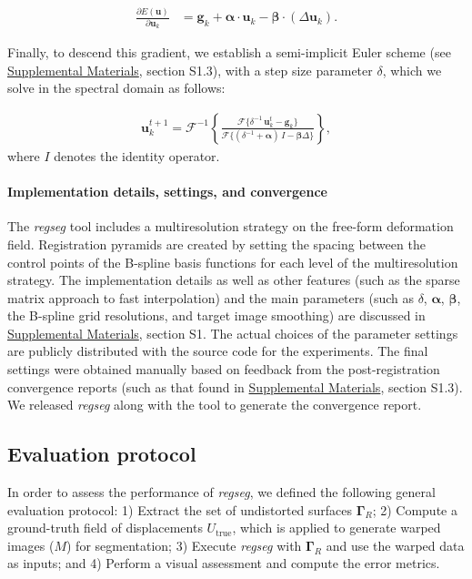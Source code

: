 \documentclass[3p,authoryear,fleqn]{elsarticle}
\providecommand{\gammaset}{\ensuremath{\boldsymbol{\Gamma}}}
\providecommand{\regseg}{\emph{regseg}}
\renewcommand{\vec}[1]{\mathbf{#1}}
\providecommand{\suppl}[1]{\href{http://figshare.com/s/459c26b4ee8211e493b306ec4bbcf141}{Supplemental Materials}, #1}
\begin{document}
  \begin{align}
  \frac{\partial E(\vec{u})}{\partial \vec{u}_k} &=
  \vec{g}_k  + \boldsymbol{\alpha} \cdot \vec{u}_k - \boldsymbol{\beta} \cdot (\Delta \vec{u}_k).
  \label{eq:final_gradient}
  \end{align}

Finally, to descend this gradient, we establish a semi-implicit Euler scheme (see \suppl{section S1.3}),
  with a step size parameter $\delta$, which we solve in the spectral domain as follows:

  \begin{align}
  \vec{u}_k^{t+1} = \mathcal{F}^{-1}\left\{ \frac{\mathcal{F}\{\delta^{-1} \, \vec{u}_k^t - \vec{g}_k\} }                  {\mathcal{F}\{(\delta^{-1} + \boldsymbol{\alpha})\, I - \boldsymbol{\beta}\Delta\}} \right\},
  \label{eq:update_equation}
  \end{align}
  where $I$ denotes the identity operator.


\paragraph*{Implementation details, settings, and convergence}
\label{sec:conv_report}
The \regseg{} tool includes a multiresolution strategy on the free-form deformation field.
Registration pyramids are created by setting the spacing between the control points of the B-spline basis
  functions for each level of the multiresolution strategy.
The implementation details as well as other features (such as the sparse matrix approach
  to fast interpolation) and the main parameters
  (such as $\delta$, $\boldsymbol{\alpha}$, $\boldsymbol{\beta}$, the B-spline grid resolutions,
 and target image smoothing) are discussed in \suppl{section S1}.
The actual choices of the parameter settings are publicly distributed with the source code for the experiments.
The final settings were obtained manually based on feedback from the post-registration convergence
  reports (such as that found in \suppl{section S1.3}).
We released \regseg{} along with the tool to generate the convergence report.

\subsection{Evaluation protocol}\label{sec:evaluation_protocol}
In order to assess the performance of \regseg{}, we defined the following general
  evaluation protocol:
1) Extract the set of undistorted surfaces $\gammaset_R$;
2) Compute a ground-truth field of displacements $U_\text{true}$, which is applied to
  generate warped images ($M$) for segmentation;
3) Execute \regseg{} with $\gammaset_R$ and use the warped data as inputs; and
4) Perform a visual assessment and compute the error metrics.
\end{document}
